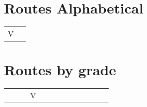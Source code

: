 \twocolumn
{}
\begin{flushleft}
\section{Routes Alphabetical}
\begin{center}
\begin{supertabular}{p{0.65\linewidth}r}
 V &  \\
\end{supertabular}
\end{center}
\section{Routes by grade}
\begin{center}
\begin{supertabular}{p{0.18\linewidth}p{0.13\linewidth}p{0.45\linewidth}p{0.08\linewidth}}
&V& &  \\
\end{supertabular}
\end{center}
\end{flushleft}
\onecolumn
\clearpage